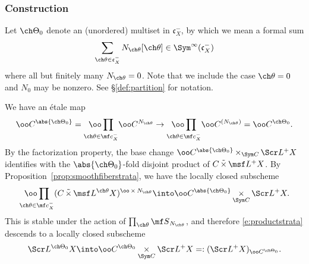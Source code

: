 \documentclass[final]{amsart}
\theoremstyle{remark}
\theoremstyle{definition}
\DeclareMathOperator*{\ttimes}{\tilde\times}
\DeclareMathOperator*{\xt}{\times}
\numberwithin{equation}{section}
\begin{document}
\subsubsection{Construction}\label{sect:constructstrata}
Let $\ch\Theta_0$ denote an (unordered) multiset in $\mathfrak c_X^-$, by 
which we mean a formal sum 
\[ \sum_{\ch\theta\in \mathfrak c_X^- } N_{\ch\theta} [\ch\theta] \in \Sym^\infty(\mathfrak c_X^-) \]
where all but finitely many $N_{\ch\theta}=0$. 
Note that we include the case $\ch\theta=0$ and $N_0$ may be nonzero. 
See \S\ref{def:partition} for notation.

We have an \'etale map 
\[ \oo C^{\abs{\ch\Theta_0}} = \underset{\ch\theta \in \mf c_X^-}{\oo\prod} \oo C^{N_{\ch\theta}} 
\to \underset{\ch\theta \in \mf c_X^-}{\oo\prod} \oo C^{(N_{\ch\theta})} = \oo C^{\ch\Theta_0}. 
\]
By the factorization property, the base change 
$\oo C^{\abs{\ch\Theta_0}} \xt_{\Sym C} \Scr L^+ X$ identifies with the $\abs{\ch\Theta_0}$-fold 
disjoint product of $C \ttimes \msf L^+ X$. 
By Proposition~\ref{prop:smoothfiberstrata}, we have the locally closed 
subscheme 
\begin{equation} \label{e:productstrata}
\underset{\ch\theta \in \mf c_X^-}{\oo\prod} (C \ttimes \msf L^{\ch\theta} X)^{\oo\xt N_{\ch\theta}} 
\into \oo C^{\abs{\ch\Theta_0}} \xt_{\Sym C} \Scr L^+ X.
\end{equation}
This is stable under the action of $\prod_{\ch\theta} {\mf S}_{N_{\ch\theta}}$,
and therefore \eqref{e:productstrata} descends to 
a locally closed subscheme 
\[ \Scr L^{\ch\Theta_0} X \into 
\oo C^{\ch\Theta_0} \underset{\Sym C}\times \Scr L^+ X =: (\Scr L^+ X)_{\oo C^{\ch\Theta_0}}. \]
\end{document}
